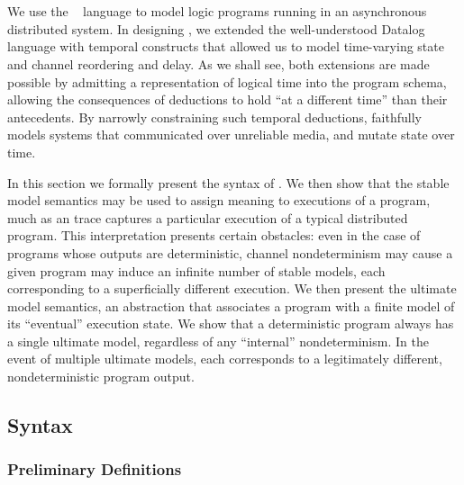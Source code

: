 \section{\large \bf \lang}
\label{sec:foundation}

We use the \lang~\cite{dedalus} language to model logic programs running in an asynchronous distributed system.
In designing \lang, we extended the well-understood Datalog language with temporal constructs that allowed
us to model time-varying state and channel reordering and delay.  As we shall see, both extensions are made
possible by admitting a representation of logical time into the program schema, allowing the consequences of
deductions to hold ``at a different time'' than their antecedents.  By narrowly constraining such temporal 
deductions, \lang faithfully models systems that communicated over unreliable media, and mutate state over time.

In this section we formally present the syntax of \lang.  We then show that the stable model semantics may be
used to assign meaning to executions of a \lang program, much as an trace captures a particular execution of a
typical distributed program.  
This interpretation presents certain obstacles:
even in the case of programs whose outputs are deterministic, channel nondeterminism may cause a given program 
may induce an infinite number of stable models, each corresponding to a superficially different execution.
We then present the ultimate model semantics, an abstraction that associates a program with a finite model of 
its ``eventual'' execution state.  We show that a deterministic program always has a single ultimate model,
regardless of any ``internal'' nondeterminism.  In the event of multiple ultimate models, each corresponds to a
legitimately different, nondeterministic program output.

\subsection{Syntax}

\subsubsection{Preliminary Definitions}


